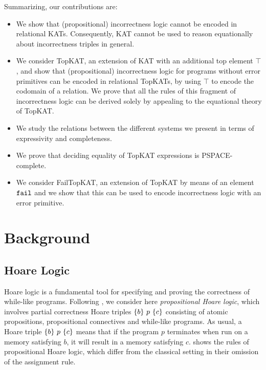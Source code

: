Summarizing, our contributions are:
\begin{itemize}
\item We show that (propositional) incorrectness logic cannot be encoded in
  relational KATs. Consequently, KAT cannot be used to reason equationally about
  incorrectness triples in general.
\item We consider TopKAT, an extension of KAT with an additional top element
  \(\top\), and show that (propositional) incorrectness logic for programs
  without error primitives can be encoded in relational TopKATs, by using \(\top\)
  to encode the codomain of a relation.  We prove that all the rules of this
  fragment of incorrectness logic can be derived solely by appealing to the
  equational theory of TopKAT\@.
\item We study the relations between the different systems we present
  in terms of expressivity and completeness.
\item We prove that deciding equality of TopKAT expressions is PSPACE-complete.
\item We consider FailTopKAT, an extension of TopKAT by means of an element
  \(\mathtt{fail}\) and we show that this can be used to encode incorrectness logic with
  an error primitive.
\end{itemize}


\section{Background}

\subsection{Hoare Logic}\label{sec:incorrectness-and-hoare}

Hoare logic is a fundamental tool for specifying and proving the correctness of
while-like programs. Following \citet{Kozen_2000}, we consider here
\emph{propositional Hoare logic}, which involves partial correctness Hoare
triples \(\{b\}~p~\{c\}\) consisting of atomic propositions,
propositional connectives and while-like programs.  As usual, a Hoare triple
\(\{b\}~p~\{c\}\) means that if the program \(p\) terminates when run on
a memory satisfying \(b\), it will result in a memory satisfying \(c\).
 shows the rules of propositional Hoare logic, which differ from
the classical setting in their omission of the assignment rule.


